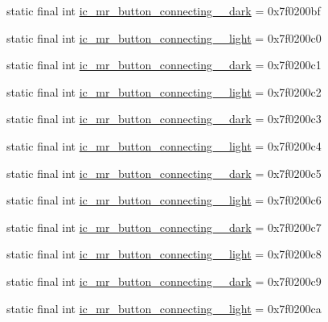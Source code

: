 \begin{CompactItemize}
static final int \hyperlink{classandroid_1_1support_1_1v7_1_1mediarouter_1_1_r_1_1drawable_434190154ce7b40b648de1f3ed37eb28}{ic\_\-mr\_\-button\_\-connecting\_\_\-dark} = 0x7f0200bf
\item 
static final int \hyperlink{classandroid_1_1support_1_1v7_1_1mediarouter_1_1_r_1_1drawable_b56ef755810216365504107e6b1f882f}{ic\_\-mr\_\-button\_\-connecting\_\_\-light} = 0x7f0200c0
\item 
static final int \hyperlink{classandroid_1_1support_1_1v7_1_1mediarouter_1_1_r_1_1drawable_45996d91ce4d0132614cb52f94fc46f2}{ic\_\-mr\_\-button\_\-connecting\_\_\-dark} = 0x7f0200c1
\item 
static final int \hyperlink{classandroid_1_1support_1_1v7_1_1mediarouter_1_1_r_1_1drawable_5b17b8f39875cd777d4f1bf16115b3f4}{ic\_\-mr\_\-button\_\-connecting\_\_\-light} = 0x7f0200c2
\item 
static final int \hyperlink{classandroid_1_1support_1_1v7_1_1mediarouter_1_1_r_1_1drawable_90383d9cd7edcb57539bf13d87afb8e2}{ic\_\-mr\_\-button\_\-connecting\_\_\-dark} = 0x7f0200c3
\item 
static final int \hyperlink{classandroid_1_1support_1_1v7_1_1mediarouter_1_1_r_1_1drawable_824c8abac17f6b08d3da6bd97e894ad3}{ic\_\-mr\_\-button\_\-connecting\_\_\-light} = 0x7f0200c4
\item 
static final int \hyperlink{classandroid_1_1support_1_1v7_1_1mediarouter_1_1_r_1_1drawable_3cb3b728f929d52d6fe7942a95150ef7}{ic\_\-mr\_\-button\_\-connecting\_\_\-dark} = 0x7f0200c5
\item 
static final int \hyperlink{classandroid_1_1support_1_1v7_1_1mediarouter_1_1_r_1_1drawable_ecccdfb3642a5fdff95462d8898c5913}{ic\_\-mr\_\-button\_\-connecting\_\_\-light} = 0x7f0200c6
\item 
static final int \hyperlink{classandroid_1_1support_1_1v7_1_1mediarouter_1_1_r_1_1drawable_888fceed433180d3fa949788dcf0da51}{ic\_\-mr\_\-button\_\-connecting\_\_\-dark} = 0x7f0200c7
\item 
static final int \hyperlink{classandroid_1_1support_1_1v7_1_1mediarouter_1_1_r_1_1drawable_dfab65d0e89b7e8a67863bb52a06057a}{ic\_\-mr\_\-button\_\-connecting\_\_\-light} = 0x7f0200c8
\item 
static final int \hyperlink{classandroid_1_1support_1_1v7_1_1mediarouter_1_1_r_1_1drawable_c57e6dd82a184abbcfa9204bdd09dd4d}{ic\_\-mr\_\-button\_\-connecting\_\_\-dark} = 0x7f0200c9
\item 
static final int \hyperlink{classandroid_1_1support_1_1v7_1_1mediarouter_1_1_r_1_1drawable_f4068dcb1fc2ec6b858b346e3f4ba6d0}{ic\_\-mr\_\-button\_\-connecting\_\_\-light} = 0x7f0200ca

\end{CompactItemize}

